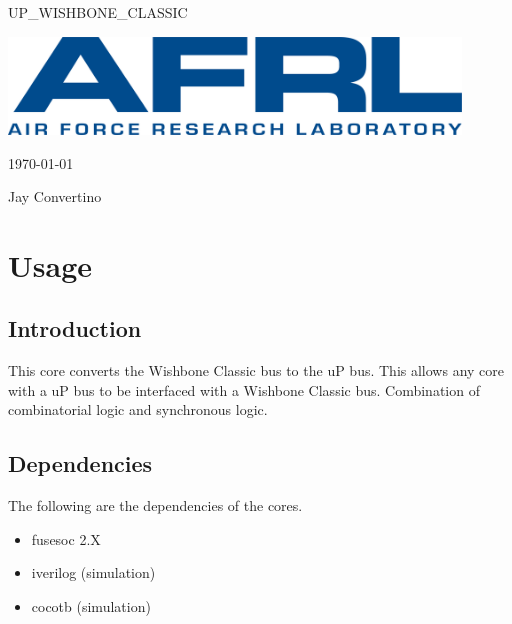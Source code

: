 \begin{titlepage}
  \begin{center}

  {\Huge UP\_WISHBONE\_CLASSIC}

  \vspace{25mm}

  \includegraphics[width=0.90\textwidth,height=\textheight,keepaspectratio]{img/AFRL.png}

  \vspace{25mm}

  \today

  \vspace{15mm}

  {\Large Jay Convertino}

  \end{center}
\end{titlepage}

\tableofcontents

\newpage

\section{Usage}

\subsection{Introduction}

\par
This core converts the Wishbone Classic bus to the uP bus. This allows any core with a uP bus to be interfaced with a Wishbone Classic bus. Combination of combinatorial logic and synchronous logic.

\subsection{Dependencies}

\par
The following are the dependencies of the cores.

\begin{itemize}
  \item fusesoc 2.X
  \item iverilog (simulation)
  \item cocotb (simulation)
\end{itemize}


